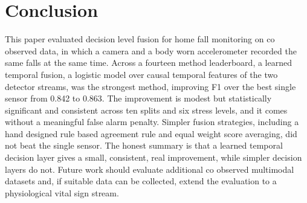 \documentclass[conference]{IEEEtran}
\begin{document}
\section{Conclusion}
This paper evaluated decision level fusion for home fall monitoring on co
observed data, in which a camera and a body worn accelerometer recorded the same
falls at the same time. Across a fourteen method leaderboard, a learned temporal
fusion, a logistic model over causal temporal features of the two detector
streams, was the strongest method, improving F1 over the best single sensor from
0.842 to 0.863. The improvement is modest but statistically significant and
consistent across ten splits and six stress levels, and it comes without a
meaningful false alarm penalty. Simpler fusion strategies, including a hand
designed rule based agreement rule and equal weight score averaging, did not beat
the single sensor. The honest summary is that a learned temporal decision layer
gives a small, consistent, real improvement, while simpler decision layers do
not. Future work should evaluate additional co observed multimodal datasets and,
if suitable data can be collected, extend the evaluation to a physiological vital
sign stream.
\end{document}
